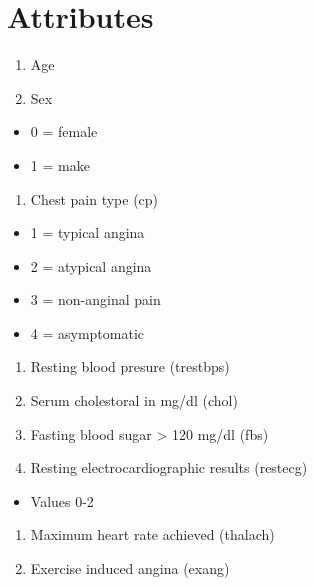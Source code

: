 \documentclass[11pt]{article}
\providecommand{\tightlist}{%
      \setlength{\itemsep}{0pt}\setlength{\parskip}{0pt}}
\begin{document}
    \section{Attributes}\label{attributes}

\begin{enumerate}
\def\labelenumi{\arabic{enumi}.}
\tightlist
\item
  Age
\item
  Sex
\end{enumerate}

\begin{itemize}
\tightlist
\item
  0 = female
\item
  1 = make
\end{itemize}

\begin{enumerate}
\def\labelenumi{\arabic{enumi}.}
\setcounter{enumi}{2}
\tightlist
\item
  Chest pain type (cp)
\end{enumerate}

\begin{itemize}
\tightlist
\item
  1 = typical angina
\item
  2 = atypical angina
\item
  3 = non-anginal pain
\item
  4 = asymptomatic
\end{itemize}

\begin{enumerate}
\def\labelenumi{\arabic{enumi}.}
\setcounter{enumi}{3}
\tightlist
\item
  Resting blood presure (trestbps)
\item
  Serum cholestoral in mg/dl (chol)
\item
  Fasting blood sugar \textgreater{} 120 mg/dl (fbs)
\item
  Resting electrocardiographic results (restecg)
\end{enumerate}

\begin{itemize}
\tightlist
\item
  Values 0-2
\end{itemize}

\begin{enumerate}
\def\labelenumi{\arabic{enumi}.}
\setcounter{enumi}{7}
\tightlist
\item
  Maximum heart rate achieved (thalach)
\item
  Exercise induced angina (exang)
\end{enumerate}
\end{document}
